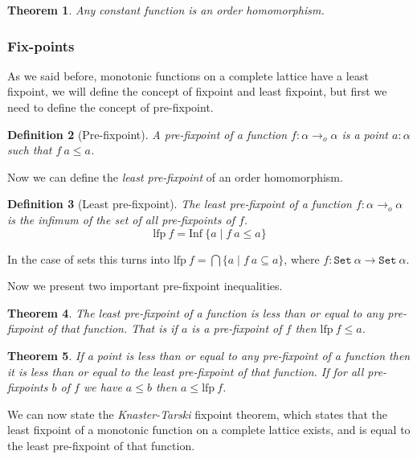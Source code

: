 \documentclass[
  a4paper, 
  10pt, 
  parskip=half, 
  DIV=20,
  toc=bibliography,
  usegeometry,
]{scrartcl}
\newtheorem{theorem}{Theorem}[section]
\newtheorem{definition}[theorem]{Definition}
\newcommand{\funfont}[1]{\text{#1}}
\newcommand{\tyfont}[1]{\texttt{#1}}
\begin{document}
\begin{theorem}
  Any constant function is an order homomorphism.
\end{theorem}

\subsubsection{Fix-points}

As we said before, monotonic functions on a complete lattice have a least fixpoint,
we will define the concept of fixpoint and least fixpoint, but first we need
to define the concept of pre-fixpoint.

\begin{definition}[Pre-fixpoint]
  A pre-fixpoint of a function \(f: \alpha \to_o \alpha\) is a point \(a: \alpha\) 
  such that \(f \ a \leq a\).
\end{definition}

Now we can define the \emph{least pre-fixpoint} of an order homomorphism.

\begin{definition}[Least pre-fixpoint]
  The least pre-fixpoint of a function \(f: \alpha \to_o \alpha\) is the infimum of 
  the set of all pre-fixpoints of \(f\).
  \[
    \funfont{lfp} \ f = \funfont{Inf} \ \{a \mid f \ a \leq a\}
  \]
\end{definition}

In the case of sets this turns into 
\(\funfont{lfp} \ f = \bigcap \{a \mid f \ a \subseteq a\}\), 
where \(f: \tyfont{Set} \ \alpha \to \tyfont{Set} \ \alpha\).

Now we present two important pre-fixpoint inequalities.

\begin{theorem}
  The least pre-fixpoint of a function is less than or equal to any
  pre-fixpoint of that function. That is if \(a\) is a pre-fixpoint
  of \(f\) then \(\funfont{lfp} \ f \leq a\).
\end{theorem}

\begin{theorem}\label{thm:lfp_le}
  If a point is less than or equal to any pre-fixpoint of a function
  then it is less than or equal to the least pre-fixpoint of that function.
  If for all pre-fixpoints \(b\) of \(f\) we have \(a \leq b\) then
  \(a \leq \funfont{lfp} \ f\).
\end{theorem}

We can now state the \emph{Knaster-Tarski} fixpoint theorem, which states that
the least fixpoint of a monotonic function on a complete lattice exists, and
is equal to the least pre-fixpoint of that function.
\end{document}

